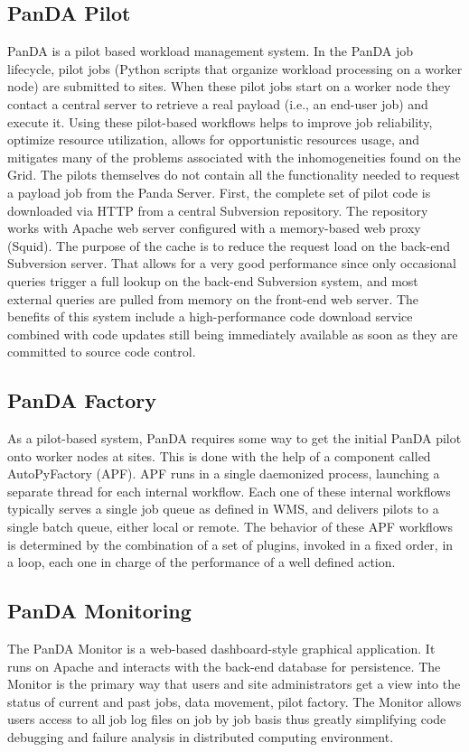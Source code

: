 \documentclass[10pt, conference, compsocconf]{IEEEtran}
\begin{document}
\subsection{PanDA Pilot}
 PanDA is a pilot based workload  management system. In the PanDA job lifecycle, pilot jobs (Python scripts that organize workload processing on a worker  node) are submitted to sites. When these  pilot jobs start on a  worker node they contact a central  server  to retrieve  a real payload (i.e., an end-user job) and execute it. Using these pilot-based  workflows helps to improve job reliability, optimize resource utilization, allows for opportunistic  resources usage, and mitigates  many of the problems  associated with the inhomogeneities found on the Grid.
The pilots themselves  do not contain all the functionality needed to request a payload  job from the Panda Server. First, the complete  set of pilot code is downloaded via HTTP from a  central Subversion repository.  The repository works with Apache web server configured  with a  memory-based   web proxy (Squid). The purpose  of the cache  is to reduce  the request load on the back-end Subversion  server. That allows for a  very good performance since only occasional  queries trigger a  full  lookup on the back-end  Subversion  system, and most external  queries are pulled from memory on the front-end web server. The benefits of this system include a high-performance code download service combined with code updates still being immediately  available  as soon as they are committed to source code control.

\subsection{PanDA Factory}
As a pilot-based  system, PanDA  requires some way to get the initial PanDA pilot onto worker nodes at sites. This is done with the help of a component  called AutoPyFactory (APF). APF runs in a single daemonized process, launching  a separate thread for each internal  workflow. Each one of these internal workflows typically serves  a single job queue  as defined  in WMS, and delivers pilots to a single batch queue, either local or remote. The behavior of these APF workflows is determined by the combination of a set  of plugins, invoked in a  fixed order, in a loop, each one in charge of the performance of a well defined action.

\subsection{PanDA Monitoring}
The PanDA Monitor is a web-based dashboard-style  graphical application. It runs on Apache and interacts with the back-end database for persistence. The Monitor is the primary way that users and site administrators get a  view into the status of current and past jobs, data movement,  pilot factory. The Monitor allows users  access  to all job log files on job by job basis thus greatly simplifying code debugging and failure analysis in distributed computing environment.
\end{document}
